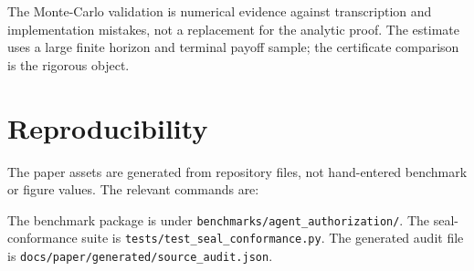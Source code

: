 \documentclass[11pt]{article}
\begin{document}
The Monte-Carlo validation is numerical evidence against transcription and implementation mistakes, not a replacement for the analytic proof. The estimate uses a large finite horizon and terminal payoff sample; the certificate comparison is the rigorous object.

\section{Reproducibility}

The paper assets are generated from repository files, not hand-entered benchmark or figure values. The relevant commands are:



The benchmark package is under \texttt{benchmarks/agent\_authorization/}. The seal-conformance suite is \texttt{tests/test\_seal\_conformance.py}. The generated audit file is \texttt{docs/paper/generated/source\_audit.json}.

\appendix

\end{document}
